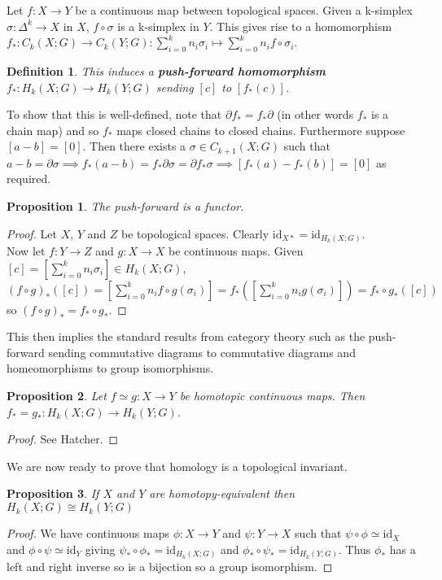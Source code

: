 \documentclass{report}
\newtheorem{definition}{Definition}
\newtheorem{proposition}{Proposition}
\begin{document}
\noindent Let $f\colon X\to Y$ be a continuous map between topological spaces. Given a k-simplex $\sigma\colon\Delta^k\to X$ in $X$, $f\circ\sigma$ is a k-simplex in $Y$. This gives rise to a homomorphism $f_*\colon C_k(X;G)\to C_k(Y;G):\sum_{i=0}^kn_i\sigma_i\mapsto\sum_{i=0}^kn_if\circ\sigma_i$.
\begin{definition}
This induces a \textbf{push-forward homomorphism} $f_*\colon H_k(X;G)\to H_k(Y;G)$ sending $[c]$ to $[f_*(c)]$.
\end{definition}
\noindent To show that this is well-defined, note that $\partial f_*=f_*\partial$ (in other words $f_*$ is a chain map) and so $f_*$ maps closed chains to closed chains. Furthermore suppose $[a-b]=[0]$. Then there exists a $\sigma\in C_{k+1}(X;G)$ such that $a-b=\partial\sigma\implies f_*(a-b)=f_*\partial\sigma=\partial f_*\sigma\implies [f_*(a)-f_*(b)]=[0]$ as required.

\begin{proposition}
The push-forward is a functor.
\end{proposition}
\begin{proof}
Let $X$, $Y$ and $Z$ be topological spaces.
Clearly $\text{id}_{X*}=\text{id}_{H_k(X;G)}$.\\
Now let $f\colon Y\to Z$ and $g\colon X\to X$ be continuous maps. Given $[c]=[\sum_{i=0}^kn_i\sigma_i]\in H_k(X;G)$, $(f\circ g)_*([c])=[\sum_{i=0}^kn_if\circ g(\sigma_i)]=f_*([\sum_{i=0}^kn_ig(\sigma_i)])=f_*\circ g_*([c])$ so $(f\circ g)_*=f_*\circ g_*$.
\end{proof}

\noindent This then implies the standard results from category theory such as the push-forward sending commutative diagrams to commutative diagrams and homeomorphisms to group isomorphisms.

\begin{proposition}
Let $f\simeq g\colon X\to Y$ be homotopic continuous maps. Then $f_*=g_*\colon H_k(X;G)\to H_k(Y;G)$.
\end{proposition}
\begin{proof}
See Hatcher.
\end{proof}

\noindent We are now ready to prove that homology is a topological invariant.
\begin{proposition}
If $X$ and $Y$ are homotopy-equivalent then $H_k(X;G)\cong H_k(Y;G)$
\end{proposition}
\begin{proof}
We have continuous maps $\phi\colon X\to Y$ and $\psi\colon Y\to X$ such that $\psi\circ\phi\simeq\text{id}_X$ and $\phi\circ\psi\simeq\text{id}_Y$ giving $\psi_*\circ\phi_*=\text{id}_{H_k(X;G)}$ and $\phi_*\circ\psi_*=\text{id}_{H_k(Y;G)}$. Thus $\phi_*$ has a left and right inverse so is a bijection so a group isomorphism.
\end{proof}
\end{document}
